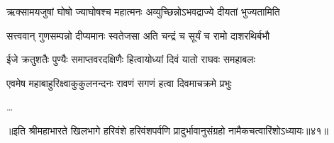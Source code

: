 \twolineshloka
{ऋक्सामयजुषां घोषो ज्याघोषश्च महात्मनः}
{अव्युच्छिन्नोऽभवद्राज्ये दीयतां भुज्यतामिति}%

\twolineshloka
{सत्त्ववान् गुणसम्पन्नो दीप्यमानः स्वतेजसा}
{अति चन्द्रं च सूर्यं च रामो दाशरथिर्बभौ}%

\twolineshloka
{ईजे क्रतुशतैः पुण्यैः समाप्तवरदक्षिणैः}
{हित्वायोध्यां दिवं यातो राघवः समहाबलः}%

\twolineshloka
{एवमेष महाबाहुरिक्ष्वाकुकुलनन्दनः}
{रावणं सगणं हत्वा दिवमाचक्रमे प्रभुः}%

\ldots

॥इति श्रीमहाभारते खिलभागे हरिवंशे हरिवंशपर्वणि प्रादुर्भावानुसंग्रहो नामैकचत्वारिंशोऽध्यायः॥४१॥


\closesection
